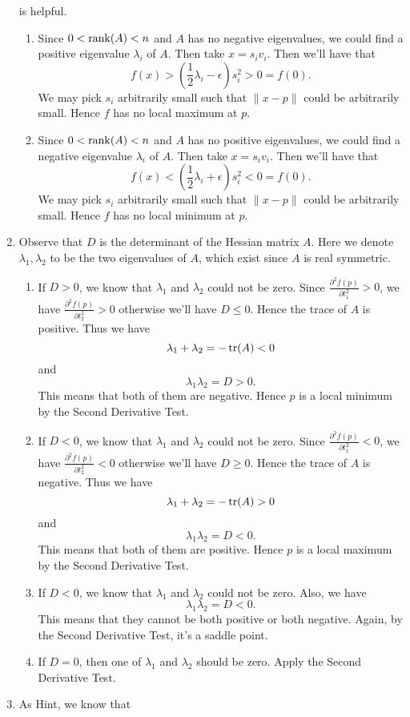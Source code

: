 \begin{enumerate}
is helpful.
\begin{enumerate}
\item Since $0<\operatorname{rank}(A)<n$ and $A$ has no negative eigenvalues, we could find a positive eigenvalue $\lambda_i$ of $A$. Then take $x=s_iv_i$. Then we'll have that 
\[f(x)>(\frac{1}{2}\lambda_i-\epsilon)s_i^2>0=f(0).\]
We may pick $s_i$ arbitrarily small such that $\|x-p\|$ could be arbitrarily small. Hence $f$ has no local maximum at $p$.
\item Since $0<\operatorname{rank}(A)<n$ and $A$ has no positive eigenvalues, we could find a negative eigenvalue $\lambda_i$ of $A$. Then take $x=s_iv_i$. Then we'll have that 
\[f(x)<(\frac{1}{2}\lambda_i+\epsilon)s_i^2<0=f(0).\]
We may pick $s_i$ arbitrarily small such that $\|x-p\|$ could be arbitrarily small. Hence $f$ has no local minimum at $p$.
\end{enumerate}
\item Observe that $D$ is the determinant of the Hessian matrix $A$. Here we denote $\lambda_1,\lambda_2$ to be the two eigenvalues of $A$, which exist since $A$ is real symmetric.
\begin{enumerate}
\item If $D>0$, we know that $\lambda_1$ and $\lambda_2$ could not be zero. Since $\frac{\partial^2f(p)}{\partial t_1^2}>0$, we have $\frac{\partial^2f(p)}{\partial t_2^2}>0$ otherwise we'll have $D\leq 0$. Hence the trace of $A$ is positive. Thus we have 
\[\lambda_1+\lambda_2=-\operatorname{tr}(A)<0\]
and 
\[\lambda_1\lambda_2=D>0.\]
This means that both of them are negative. Hence $p$ is a local minimum by the Second Derivative Test.
\item If $D<0$, we know that $\lambda_1$ and $\lambda_2$ could not be zero. Since $\frac{\partial^2f(p)}{\partial t_1^2}<0$, we have $\frac{\partial^2f(p)}{\partial t_2^2}<0$ otherwise we'll have $D\geq 0$. Hence the trace of $A$ is negative. Thus we have 
\[\lambda_1+\lambda_2=-\operatorname{tr}(A)>0\]
and 
\[\lambda_1\lambda_2=D<0.\]
This means that both of them are positive. Hence $p$ is a local maximum by the Second Derivative Test.
\item If $D<0$, we know that $\lambda_1$ and $\lambda_2$ could not be zero. Also, we have 
\[\lambda_1\lambda_2=D<0.\]
This means that they cannot be both positive or both negative. Again, by the Second Derivative Test, it's a saddle point.
\item If $D=0$, then one of $\lambda_1$ and $\lambda_2$ should be zero. Apply the Second Derivative Test.
\end{enumerate}
\item As Hint, we know that 

\end{enumerate}
